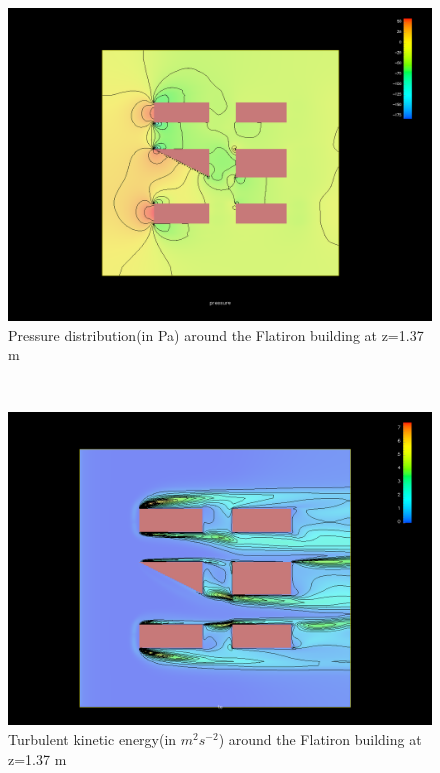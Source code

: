 \begin{figure}[h!]
\centering
\includegraphics[width = \textwidth]{zpressure.png}
\caption{Pressure distribution(in Pa) around the Flatiron building at z=1.37 m}
\label{fig:zpressure}
\end{figure}\\
\begin{figure}[h!]
\centering
\includegraphics[width = \textwidth]{zenergy.png}
\caption{Turbulent kinetic energy(in $m^2s^{-2}$) around the Flatiron building at z=1.37 m}
\label{fig:zenergy}
\end{figure}\\